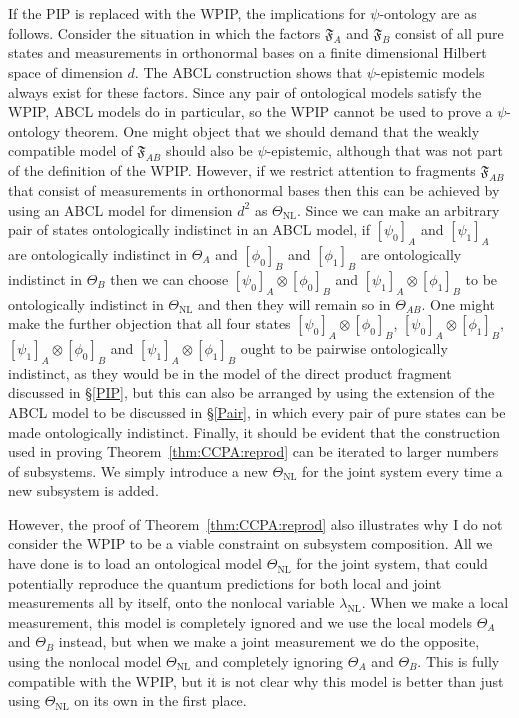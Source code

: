 \documentclass[DIV=calc,paper=a4,fontsize=11pt,twocolumn]{scrartcl} %
\theoremstyle{definition}
\theoremstyle{plain}
\newcommand{\Proj}[1]{\ensuremath{\left [ #1 \right ]}}
\begin{document}
If the PIP is replaced with the WPIP, the implications for
$\psi$-ontology are as follows.  Consider the situation in which the
factors $\mathfrak{F}_A$ and $\mathfrak{F}_B$ consist of all pure
states and measurements in orthonormal bases on a finite dimensional
Hilbert space of dimension $d$.  The ABCL construction shows that
$\psi$-epistemic models always exist for these factors.  Since any
pair of ontological models satisfy the WPIP, ABCL models do in
particular, so the WPIP cannot be used to prove a $\psi$-ontology
theorem.  One might object that we should demand that the weakly
compatible model of $\mathfrak{F}_{AB}$ should also be
$\psi$-epistemic, although that was not part of the definition of the
WPIP\@.  However, if we restrict attention to fragments
$\mathfrak{F}_{AB}$ that consist of measurements in orthonormal bases
then this can be achieved by using an ABCL model for dimension $d^2$
as $\Theta_{\text{NL}}$.  Since we can make an arbitrary pair of
states ontologically indistinct in an ABCL model, if $\Proj{\psi_0}_A$
and $\Proj{\psi_1}_A$ are ontologically indistinct in $\Theta_A$ and
$\Proj{\phi_0}_B$ and $\Proj{\phi_1}_B$ are ontologically indistinct
in $\Theta_B$ then we can choose $\Proj{\psi_0}_A \otimes
\Proj{\phi_0}_B$ and $\Proj{\psi_1}_A \otimes \Proj{\phi_1}_B$ to be
ontologically indistinct in $\Theta_{\text{NL}}$ and then they will
remain so in $\Theta_{AB}$.  One might make the further objection that
all four states $\Proj{\psi_0}_A \otimes \Proj{\phi_0}_B$,
$\Proj{\psi_0}_A \otimes \Proj{\phi_1}_B$, $\Proj{\psi_1}_A \otimes
\Proj{\phi_0}_B$ and $\Proj{\psi_1}_A \otimes \Proj{\phi_1}_B$ ought
to be pairwise ontologically indistinct, as they would be in the model
of the direct product fragment discussed in \S\ref{PIP}, but this can
also be arranged by using the extension of the ABCL model to be
discussed in \S\ref{Pair}, in which every pair of pure states can be
made ontologically indistinct.  Finally, it should be evident that the
construction used in proving Theorem~\ref{thm:CCPA:reprod} can be
iterated to larger numbers of subsystems.  We simply introduce a new
$\Theta_{\text{NL}}$ for the joint system every time a new subsystem
is added.

However, the proof of Theorem~\ref{thm:CCPA:reprod} also illustrates
why I do not consider the WPIP to be a viable constraint on subsystem
composition.  All we have done is to load an ontological model
$\Theta_{\text{NL}}$ for the joint system, that could potentially
reproduce the quantum predictions for both local and joint
measurements all by itself, onto the nonlocal variable
$\lambda_{\text{NL}}$.  When we make a local measurement, this model
is completely ignored and we use the local models $\Theta_A$ and
$\Theta_B$ instead, but when we make a joint measurement we do the
opposite, using the nonlocal model $\Theta_{\text{NL}}$ and completely
ignoring $\Theta_A$ and $\Theta_B$.  This is fully compatible with the
WPIP, but it is not clear why this model is better than just using
$\Theta_{\text{NL}}$ on its own in the first place.
\end{document}
